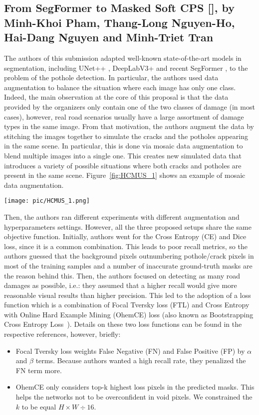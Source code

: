 \documentclass[twocolumn]{article}
\begin{document}
\subsection{From SegFormer to Masked Soft CPS [\HCMUS{}], by Minh-Khoi Pham, Thang-Long Nguyen-Ho, Hai-Dang Nguyen and Minh-Triet Tran}
The authors of this submission adapted well-known state-of-the-art models in segmentation, including UNet++ \cite{zhou2018unet++}, DeepLabV3+ \cite{chen2018encoder} and recent SegFormer \cite{xie2021segformer}, to the problem of the pothole detection. In particular, the authors used data augmentation to balance the situation where each image has only one class. Indeed, the main observation at the core of this proposal is that the data provided by the organizers only contain one of the two classes of damage (in most cases), however, real road scenarios usually have a large assortment of damage types in the same image. From that motivation, the authors augment the data by stitching the images together to simulate the cracks and the potholes appearing in the same scene. In particular, this is done via mosaic data augmentation to blend multiple images into a single one. This creates new simulated data that introduces a variety of possible situations where both cracks and potholes are present in the same scene. Figure~\ref{fig:HCMUS_1} shows an example of mosaic data augmentation.

\begin{figure*}[t]
    \centering
    \texttt{[image: pic/HCMUS\_1.png]}
    \caption{An example of the Mosaic Augmentation used in \HCMUS.}
    \label{fig:HCMUS_1}
\end{figure*}

Then, the authors ran different experiments with different augmentation and hyperparameters settings. However, all the three proposed setups share the same objective function. Initially, authors went for the Cross Entropy (CE) and Dice loss, since it is a common combination. This leads to poor recall metrics, so the authors guessed that the background pixels outnumbering pothole/crack pixels in most of the training samples and a number of inaccurate ground-truth masks are the reason behind this. Then, the authors focused on detecting as many road damages as possible, i.e.: they assumed that a higher recall would give more reasonable visual results than higher precision. This led to the adoption of a loss function which is a combination of Focal Tversky loss (FTL) \cite{abraham2019novel} and Cross Entropy with Online Hard Example Mining (OhemCE) loss (also known as Bootstrapping Cross Entropy Loss~\cite{OhemCE}). Details on these two loss functions can be found in the respective references, however, briefly: 
\begin{itemize}
\item Focal Tversky loss weights False Negative (FN) and False Positive (FP) by $\alpha$ and $\beta$ terms. Because authors wanted a high recall rate, they penalized the FN term more.
\item OhemCE only considers top-k highest loss pixels in the predicted masks. This helps the networks not to be overconfident in void pixels. We constrained the $k$ to be equal $H \times W \div 16$.
\end{itemize} 
\end{document}
